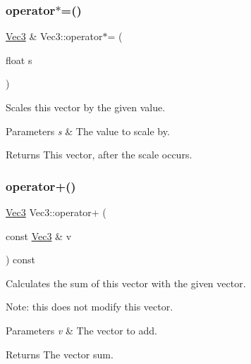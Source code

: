\subsubsection{\texorpdfstring{operator$\ast$=()}{operator*=()}\hspace{0.1cm}{\footnotesize\ttfamily [2/2]}}
{\footnotesize\ttfamily \hyperlink{classVec3}{Vec3} \& Vec3\+::operator$\ast$= (\begin{DoxyParamCaption}\item[{float}]{s }\end{DoxyParamCaption})\hspace{0.3cm}{\ttfamily [inline]}}

Scales this vector by the given value.


\begin{DoxyParams}{Parameters}
{\em s} & The value to scale by. \\
\hline
\end{DoxyParams}
\begin{DoxyReturn}{Returns}
This vector, after the scale occurs. 
\end{DoxyReturn}
\mbox{\label{classVec3_afc46ae6022e89d29fe5456cab636d804}} 
\subsubsection{\texorpdfstring{operator+()}{operator+()}\hspace{0.1cm}{\footnotesize\ttfamily [1/2]}}
{\footnotesize\ttfamily \hyperlink{classVec3}{Vec3} Vec3\+::operator+ (\begin{DoxyParamCaption}\item[{const \hyperlink{classVec3}{Vec3} \&}]{v }\end{DoxyParamCaption}) const\hspace{0.3cm}{\ttfamily [inline]}}

Calculates the sum of this vector with the given vector.

Note\+: this does not modify this vector.


\begin{DoxyParams}{Parameters}
{\em v} & The vector to add. \\
\hline
\end{DoxyParams}
\begin{DoxyReturn}{Returns}
The vector sum. 
\end{DoxyReturn}
\mbox{\label{classVec3_afc46ae6022e89d29fe5456cab636d804}} 
